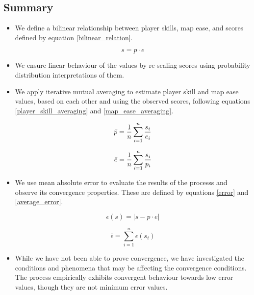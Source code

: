 \documentclass[12pt,a4paper]{article}
\begin{document}
\subsection{Summary}

\begin{itemize}

\item We define a bilinear relationship between player skills, map ease, and scores defined by equation \ref{bilinear_relation}.

\begin{equation*}
s = p \cdot e
\end{equation*}

\item We ensure linear behaviour of the values by re-scaling scores using probability distribution interpretations of them.

\item We apply iterative mutual averaging to estimate player skill and map ease values, based on each other and using the observed scores, following equations \ref{player_skill_averaging} and \ref{map_ease_averaging}.

\begin{equation*}
\bar{p}  = {{1} \over {n}} \sum\limits_{i = 1}^{n} {{s_i} \over {e_i}}
\end{equation*}

\begin{equation*}
\bar{e}  = {{1} \over {n}} \sum\limits_{i = 1}^{n} {{s_i} \over {p_i}}
\end{equation*}

\item We use mean absolute error to evaluate the results of the processs and observe its convergence properties. These are defined by equations \ref{error} and \ref{average_error}.

\begin{equation*}
\epsilon(s) = |s -  p \cdot e|
\end{equation*}

\begin{equation*}
\bar{\epsilon} = \sum\limits_{i=1}^{n} \epsilon(s_i)
\end{equation*}

\item While we have not been able to prove convergence, we have investigated the conditions and phenomena that may be affecting the convergence conditions. The process empirically exhibits convergent behaviour towards low error values, though they are not minimum error values.

\end{itemize}
\end{document}

